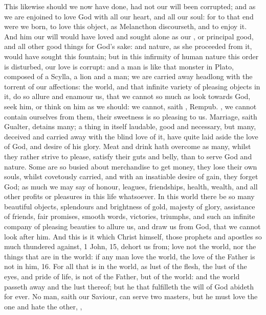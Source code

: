 {This likewise should we now have done, had not our will been corrupted;
and as we are enjoined to love God with all our heart, and all our
soul: for to that end were we born, to love this object, as
Melancthon discourseth, and to enjoy it. And him our will would
have loved and sought alone as our , or principal good, and
all other good things for God's sake: and nature, as she proceeded from
it, would have sought this fountain; but in this infirmity of human
nature this order is disturbed, our love is corrupt: and a man is like
that monster in Plato, composed of a Scylla, a lion and a man; we
are carried away headlong with the torrent of our affections: the
world, and that infinite variety of pleasing objects in it, do so
allure and enamour us, that we cannot so much as look towards God, seek
him, or think on him as we should: we cannot, saith \Austin{}, \textlatin{Rempub}.
, we cannot contain ourselves from them, their
sweetness is so pleasing to us. Marriage, saith  Gualter, detains
many; a thing in itself laudable, good and necessary, but many,
deceived and carried away with the blind love of it, have quite laid
aside the love of God, and desire of his glory. Meat and drink hath
overcome as many, whilst they rather strive to please, satisfy their
guts and belly, than to serve God and nature. Some are so busied about
merchandise to get money, they lose their own souls, whilst covetously
carried, and with an insatiable desire of gain, they forget God; as
much we may say of honour, leagues, friendships, health, wealth, and
all other profits or pleasures in this life whatsoever. In this
world there be so many beautiful objects, splendours and brightness of
gold, majesty of glory, assistance of friends, fair promises, smooth
words, victories, triumphs, and such an infinite company of pleasing
beauties to allure us, and draw us from God, that we cannot look after
him. And this is it which Christ himself, those prophets and apostles
so much thundered against, 1 John,  15, dehort us from; love not
the world, nor the things that are in the world: if any man love the
world, the love of the Father is not in him, 16. For all that is in the
world, as lust of the flesh, the lust of the eyes, and pride of life,
is not of the Father, but of the world: and the world passeth away and
the lust thereof; but he that fulfilleth the will of God abideth for
ever. No man, saith our Saviour, can serve two masters, but he must
love the one and hate the other, \etc{}, }
